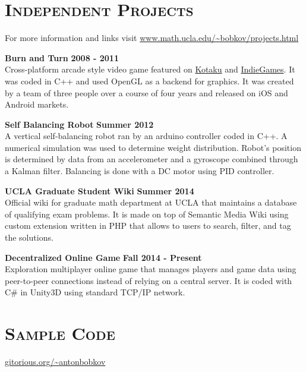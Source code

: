 \documentclass[margin, 10pt]{res} %
\begin{document}
\begin{resume}
 
\section{\textsc{Independent Projects}}
For more information and links visit \url{www.math.ucla.edu/~bobkov/projects.html}

\textbf{Burn and Turn} \hfill \textbf{2008 - 2011}\\
Cross-platform arcade style video game featured on \href{http://kotaku.com/5862197/burn-and-turn-combines-retro-arcade-stylings-with-tower-defense-for-combustible-fun}{Kotaku} and \href{http://indiegames.com/2011/10/trailer_burn_turn_robot_bear.html}{IndieGames}. It was coded in C++ and used OpenGL as a backend for graphics. It was created by a team of three people over a course of four years and released on iOS and Android markets.

\textbf{Self Balancing Robot} \hfill \textbf{Summer 2012}\\
A vertical self-balancing robot ran by an arduino controller coded in C++. A numerical simulation was used to determine weight distribution. Robot's position is determined by data from an accelerometer and a gyroscope combined through a Kalman filter. Balancing is done with a DC motor using PID controller.

\textbf{UCLA Graduate Student Wiki} \hfill \textbf{Summer 2014}\\
Official wiki for graduate math department at UCLA that maintains a database of qualifying exam problems. It is made on top of Semantic Media Wiki using custom extension written in PHP that allows to users to search, filter, and tag the solutions.

\textbf{Decentralized Online Game} \hfill \textbf{Fall 2014 - Present}\\
Exploration multiplayer online game that manages players and game data using peer-to-peer connections instead of relying on a central server. It is coded with C\# in Unity3D using standard TCP/IP network.

\section{\textsc{Sample Code}}
\url{gitorious.org/~antonbobkov}

\end{resume}
\end{document}
